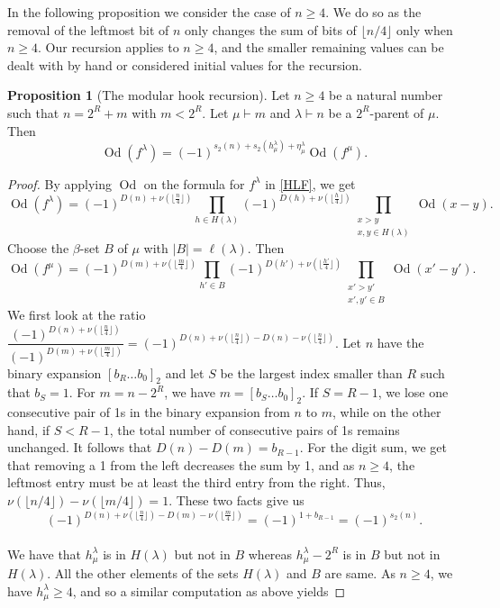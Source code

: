 \documentclass[12pt]{amsart}
\theoremstyle{definition}
\newtheorem{proposition}[theorem]{Proposition}
\numberwithin{equation}{section}
\newcommand{\la}{\lambda}
\newcommand{\workhorse}{modular hook recursion}
\DeclareMathOperator{\Od}{Od}
\begin{document}
In the following proposition we consider the case of $n\geq 4$. We do so as the removal of the leftmost bit of $n$ only changes the sum of bits of $\lfloor n/4 \rfloor$ only when $n\geq 4$. Our recursion applies to $n\geq 4$, and the smaller remaining values can be dealt with by hand or considered initial values for the recursion.
\begin{proposition}[The \workhorse]\label{workhorse}
Let $n\geq 4$ be a natural number such that $n = 2^R +m$ with $m<2^R$. Let $\mu\vdash m$ and $\lambda\vdash n$ be a $2^R$-parent of $\mu$. Then
\[
\Od(f^{\lambda}) = (-1)^{s_2(n) + s_2(h^\lambda_\mu) + \eta^\lambda_\mu}\Od(f^{\mu}).
\]
\end{proposition}
\begin{proof}
By applying $\Od$ on the formula for $f^\lambda$ in \cref{HLF}, we get
\[
\Od(f^{\lambda}) = (-1)^{D(n) + \nu(\lfloor \frac{n}{4} \rfloor)}\prod\limits_{h\in H(\lambda)} (-1)^{D(h) + \nu(\lfloor \frac{h}{4} \rfloor)} \prod\limits_{\substack{x > y\\ x,y\in H(\lambda)}} \Od(x-y).
\]
Choose the $\beta$-set $B$ of $\mu$ with $|B| = \ell(\lambda)$. Then
\[
\Od(f^{\mu}) = (-1)^{D(m) + \nu(\lfloor \frac{m}{4} \rfloor)}\prod\limits_{h'\in B} (-1)^{D(h') + \nu(\lfloor \frac{h'}{4} \rfloor)} \prod\limits_{\substack{x'> y'\\ x',y'\in B}} \Od(x'-y').\]
We first look at the ratio $\dfrac{(-1)^{D(n) + \nu(\lfloor \frac{n}{4} \rfloor)}}{(-1)^{D(m) + \nu(\lfloor \frac{m}{4} \rfloor)}} = (-1)^{D(n) + \nu(\lfloor \frac{n}{4} \rfloor) - D(n) - \nu(\lfloor \frac{n}{4} \rfloor)}$.
Let $n$ have the binary expansion $[b_R\ldots b_0]_2$ and let $S$ be the largest index smaller than $R$ such that $b_S = 1$. For $m = n-2^R$, we have $m = [b_{S}\ldots b_0]_2$. If $S = R-1$, we lose one consecutive pair of 1s in the binary expansion from $n$ to $m$, while on the other hand, if $S < R-1$, the total number of consecutive pairs of 1s remains unchanged. It follows that $D(n) - D(m) = b_{R-1}$. For the digit sum, we get that removing a 1 from the left decreases the sum by 1, and as $n \geq 4$, the leftmost entry must be at least the third entry from the right. Thus, $\nu(\lfloor n/4 \rfloor) - \nu(\lfloor m/4 \rfloor) =1$. These two facts give us \[(-1)^{D(n) + \nu(\lfloor \frac{n}{4} \rfloor) - D(m) - \nu(\lfloor \frac{m}{4} \rfloor)} = (-1)^{1 +b_{R-1}} = (-1)^{s_2(n)}.\]\\
We have that $h^\lambda_\mu$ is in $H(\lambda)$ but not in $B$ whereas $h^\lambda_\mu-2^R$ is in $B$ but not in $H(\lambda)$. All the other elements of the sets $H(\lambda)$ and $B$ are same. As $n\geq 4$, we have $h^\la_\mu \geq 4$, and so a similar computation as above yields

\end{proof}
\end{document}
